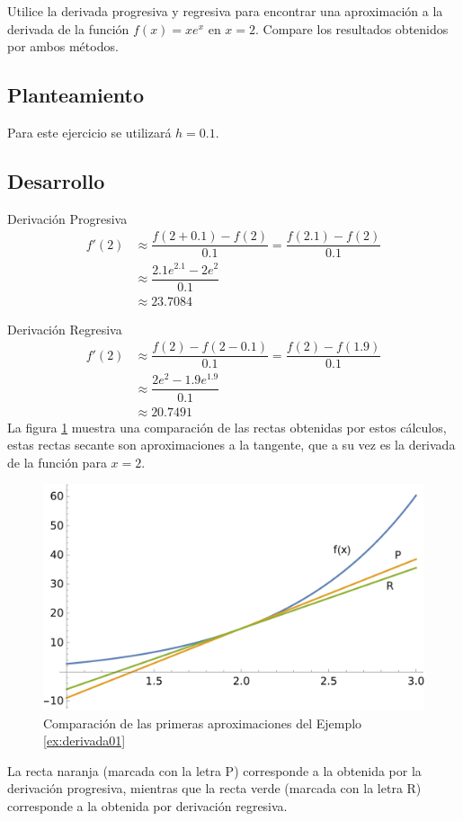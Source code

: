 \begin{exerciseT}{\rm
Utilice la derivada progresiva y regresiva para encontrar una aproximación a la derivada de la función $f(x) = xe^x$ en $x=2$. 
Compare los resultados obtenidos por ambos métodos.

\subsection*{Planteamiento}
Para este ejercicio se utilizará $h=0.1$. 

\subsection*{Desarrollo}

Derivación Progresiva
\begin{align*}
	f'(2) &\approx \dfrac{f(2+0.1)-f(2)}{0.1} = \dfrac{f(2.1)-f(2)}{0.1} \\
		&\approx \dfrac{2.1e^{2.1}-2e^2}{0.1}\\
		&\approx 23.7084
\end{align*}

Derivación Regresiva
\begin{align*}
	f'(2) &\approx \dfrac{f(2)-f(2-0.1)}{0.1} = \dfrac{f(2)-f(1.9)}{0.1} \\
		&\approx \dfrac{2e^2 - 1.9e^{1.9}}{0.1}\\
		&\approx 20.7491
\end{align*}
La figura \ref{fig:derivada01} muestra una comparación de las rectas obtenidas por estos cálculos, estas rectas
secante son aproximaciones a la tangente, que a su vez es la derivada de la función para $x=2$.
\begin{figure}[H]
	\centering
	\includegraphics[scale=0.5]{img/Derivada01.pdf}
	\caption{Comparación de las primeras aproximaciones del Ejemplo \ref{ex:derivada01}}
	\label{fig:derivada01}
\end{figure}
La recta naranja (marcada con la letra P) corresponde a la obtenida por la derivación progresiva, mientras que la 
recta verde (marcada con la letra R) corresponde a la obtenida por derivación regresiva.

}
\end{exerciseT}
